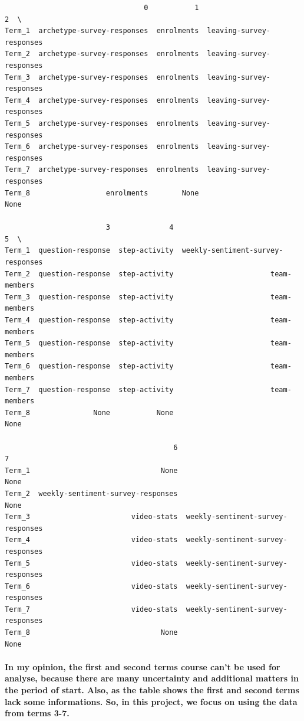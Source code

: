 \documentclass[11pt]{article}
\begin{document}
    
    \begin{verbatim}
                                 0           1                         2  \
Term_1  archetype-survey-responses  enrolments  leaving-survey-responses   
Term_2  archetype-survey-responses  enrolments  leaving-survey-responses   
Term_3  archetype-survey-responses  enrolments  leaving-survey-responses   
Term_4  archetype-survey-responses  enrolments  leaving-survey-responses   
Term_5  archetype-survey-responses  enrolments  leaving-survey-responses   
Term_6  archetype-survey-responses  enrolments  leaving-survey-responses   
Term_7  archetype-survey-responses  enrolments  leaving-survey-responses   
Term_8                  enrolments        None                      None   

                        3              4                                  5  \
Term_1  question-response  step-activity  weekly-sentiment-survey-responses   
Term_2  question-response  step-activity                       team-members   
Term_3  question-response  step-activity                       team-members   
Term_4  question-response  step-activity                       team-members   
Term_5  question-response  step-activity                       team-members   
Term_6  question-response  step-activity                       team-members   
Term_7  question-response  step-activity                       team-members   
Term_8               None           None                               None   

                                        6                                  7  
Term_1                               None                               None  
Term_2  weekly-sentiment-survey-responses                               None  
Term_3                        video-stats  weekly-sentiment-survey-responses  
Term_4                        video-stats  weekly-sentiment-survey-responses  
Term_5                        video-stats  weekly-sentiment-survey-responses  
Term_6                        video-stats  weekly-sentiment-survey-responses  
Term_7                        video-stats  weekly-sentiment-survey-responses  
Term_8                               None                               None  
    \end{verbatim}

    
    \paragraph{In my opinion, the first and second terms course can't be
used for analyse, because there are many uncertainty and additional
matters in the period of start. Also, as the table shows the first and
second terms lack some informations. So, in this project, we focus on
using the data from terms
3-7.}\label{in-my-opinion-the-first-and-second-terms-course-cant-be-used-for-analyse-because-there-are-many-uncertainty-and-additional-matters-in-the-period-of-start.-also-as-the-table-shows-the-first-and-second-terms-lack-some-informations.-so-in-this-project-we-focus-on-using-the-data-from-terms-3-7.}
\end{document}
